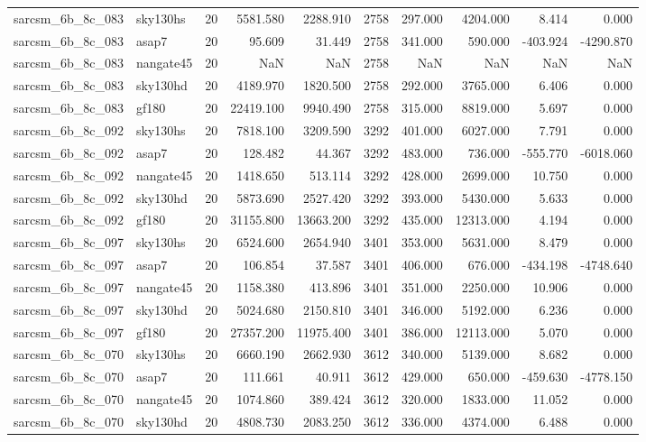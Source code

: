 \begin{longtable}{llrrrrrrrr}
sarcsm\_6b\_8c\_083 & sky130hs & 20 & 5581.580 & 2288.910 & 2758 & 297.000 & 4204.000 & 8.414 & 0.000 \\
sarcsm\_6b\_8c\_083 & asap7 & 20 & 95.609 & 31.449 & 2758 & 341.000 & 590.000 & -403.924 & -4290.870 \\
sarcsm\_6b\_8c\_083 & nangate45 & 20 & NaN & NaN & 2758 & NaN & NaN & NaN & NaN \\
sarcsm\_6b\_8c\_083 & sky130hd & 20 & 4189.970 & 1820.500 & 2758 & 292.000 & 3765.000 & 6.406 & 0.000 \\
sarcsm\_6b\_8c\_083 & gf180 & 20 & 22419.100 & 9940.490 & 2758 & 315.000 & 8819.000 & 5.697 & 0.000 \\
sarcsm\_6b\_8c\_092 & sky130hs & 20 & 7818.100 & 3209.590 & 3292 & 401.000 & 6027.000 & 7.791 & 0.000 \\
sarcsm\_6b\_8c\_092 & asap7 & 20 & 128.482 & 44.367 & 3292 & 483.000 & 736.000 & -555.770 & -6018.060 \\
sarcsm\_6b\_8c\_092 & nangate45 & 20 & 1418.650 & 513.114 & 3292 & 428.000 & 2699.000 & 10.750 & 0.000 \\
sarcsm\_6b\_8c\_092 & sky130hd & 20 & 5873.690 & 2527.420 & 3292 & 393.000 & 5430.000 & 5.633 & 0.000 \\
sarcsm\_6b\_8c\_092 & gf180 & 20 & 31155.800 & 13663.200 & 3292 & 435.000 & 12313.000 & 4.194 & 0.000 \\
sarcsm\_6b\_8c\_097 & sky130hs & 20 & 6524.600 & 2654.940 & 3401 & 353.000 & 5631.000 & 8.479 & 0.000 \\
sarcsm\_6b\_8c\_097 & asap7 & 20 & 106.854 & 37.587 & 3401 & 406.000 & 676.000 & -434.198 & -4748.640 \\
sarcsm\_6b\_8c\_097 & nangate45 & 20 & 1158.380 & 413.896 & 3401 & 351.000 & 2250.000 & 10.906 & 0.000 \\
sarcsm\_6b\_8c\_097 & sky130hd & 20 & 5024.680 & 2150.810 & 3401 & 346.000 & 5192.000 & 6.236 & 0.000 \\
sarcsm\_6b\_8c\_097 & gf180 & 20 & 27357.200 & 11975.400 & 3401 & 386.000 & 12113.000 & 5.070 & 0.000 \\
sarcsm\_6b\_8c\_070 & sky130hs & 20 & 6660.190 & 2662.930 & 3612 & 340.000 & 5139.000 & 8.682 & 0.000 \\
sarcsm\_6b\_8c\_070 & asap7 & 20 & 111.661 & 40.911 & 3612 & 429.000 & 650.000 & -459.630 & -4778.150 \\
sarcsm\_6b\_8c\_070 & nangate45 & 20 & 1074.860 & 389.424 & 3612 & 320.000 & 1833.000 & 11.052 & 0.000 \\
sarcsm\_6b\_8c\_070 & sky130hd & 20 & 4808.730 & 2083.250 & 3612 & 336.000 & 4374.000 & 6.488 & 0.000 \\

\end{longtable}
